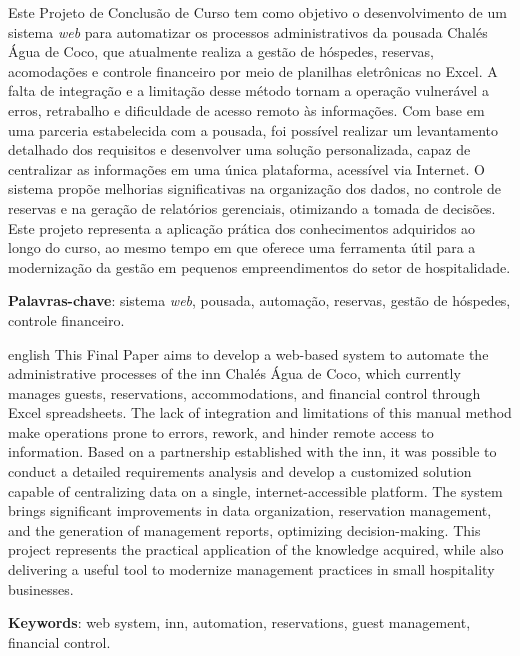 \documentclass[
	12pt,				%
	openany,			%
	oneside,			%
	a4paper,			%
	english,			%
	french,				%
	spanish,			%
	brazil				%
	]{abntex2}
\begin{document}
\setlength{\absparsep}{18pt} %
\begin{resumo}
	Este Projeto de Conclusão de Curso tem como objetivo o desenvolvimento de um sistema \textit{web} para automatizar os processos administrativos da pousada Chalés Água de Coco, que atualmente realiza a gestão de hóspedes, reservas, acomodações e controle financeiro por meio de planilhas eletrônicas no Excel. A falta de integração e a limitação desse método tornam a operação vulnerável a erros, retrabalho e dificuldade de acesso remoto às informações. Com base em uma parceria estabelecida com a pousada, foi possível realizar um levantamento detalhado dos requisitos e desenvolver uma solução personalizada, capaz de centralizar as informações em uma única plataforma, acessível via Internet. O sistema propõe melhorias significativas na organização dos dados, no controle de reservas e na geração de relatórios gerenciais, otimizando a tomada de decisões. Este projeto representa a aplicação prática dos conhecimentos adquiridos ao longo do curso, ao mesmo tempo em que oferece uma ferramenta útil para a modernização da gestão em pequenos empreendimentos do setor de hospitalidade.
	
	\textbf{Palavras-chave}: sistema \textit{web}, pousada, automação, reservas, gestão de hóspedes, controle financeiro.
\end{resumo}
\begin{resumo}[Abstract]
	\begin{otherlanguage*}{english}
		This Final Paper aims to develop a web-based system to automate the administrative processes of the inn Chalés Água de Coco, which currently manages guests, reservations, accommodations, and financial control through Excel spreadsheets. The lack of integration and limitations of this manual method make operations prone to errors, rework, and hinder remote access to information. Based on a partnership established with the inn, it was possible to conduct a detailed requirements analysis and develop a customized solution capable of centralizing data on a single, internet-accessible platform. The system brings significant improvements in data organization, reservation management, and the generation of management reports, optimizing decision-making. This project represents the practical application of the knowledge acquired, while also delivering a useful tool to modernize management practices in small hospitality businesses.
		
		\vspace{\onelineskip}
		
		\noindent 
		\textbf{Keywords}: web system, inn, automation, reservations, guest management, financial control.
	\end{otherlanguage*}
\end{resumo}
\end{document}
